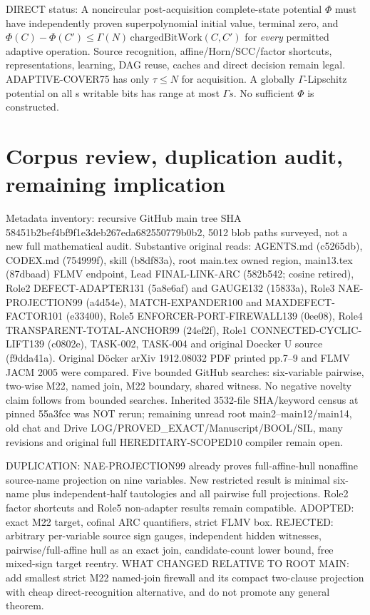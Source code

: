 \documentclass[11pt]{article}
\begin{document}
DIRECT status: A noncircular post-acquisition complete-state potential $\Phi$ must have independently proven superpolynomial initial value, terminal zero, and $\Phi(C)-\Phi(C')\le\Gamma(N)\,\mathrm{chargedBitWork}(C,C')$ for \emph{every} permitted adaptive operation. Source recognition, affine/Horn/SCC/factor shortcuts, representations, learning, DAG reuse, caches and direct decision remain legal. ADAPTIVE-COVER75 has only $\tau\le N$ for acquisition. A globally $\Gamma$-Lipschitz potential on all s writable bits has range at most $\Gamma s$. No sufficient $\Phi$ is constructed.

\section{Corpus review, duplication audit, remaining implication}
Metadata inventory: recursive GitHub main tree SHA 58451b2bef4bf9f1e3deb267eda682550779b0b2, 5012 blob paths surveyed, not a new full mathematical audit. Substantive original reads: AGENTS.md (c5265db), CODEX.md (754999f), skill (b8df83a), root main.tex owned region, main13.tex (87dbaad) FLMV endpoint, Lead FINAL-LINK-ARC (582b542; cosine retired), Role2 DEFECT-ADAPTER131 (5a8e6af) and GAUGE132 (15833a), Role3 NAE-PROJECTION99 (a4d54e), MATCH-EXPANDER100 and MAXDEFECT-FACTOR101 (e33400), Role5 ENFORCER-PORT-FIREWALL139 (0ee08), Role4 TRANSPARENT-TOTAL-ANCHOR99 (24ef2f), Role1 CONNECTED-CYCLIC-LIFT139 (c0802e), TASK-002, TASK-004 and original Doecker U source (f9dda41a). Original D\"ocker arXiv 1912.08032 PDF printed pp.7--9 and FLMV JACM 2005 were compared. Five bounded GitHub searches: six-variable pairwise, two-wise M22, named join, M22 boundary, shared witness. No negative novelty claim follows from bounded searches. Inherited 3532-file SHA/keyword census at pinned 55a3fcc was NOT rerun; remaining unread root main2--main12/main14, old chat and Drive LOG/PROVED\_EXACT/Manuscript/BOOL/SIL, many revisions and original full HEREDITARY-SCOPED10 compiler remain open.

DUPLICATION: NAE-PROJECTION99 already proves full-affine-hull nonaffine source-name projection on nine variables. New restricted result is minimal six-name plus independent-half tautologies and all pairwise full projections. Role2 factor shortcuts and Role5 non-adapter results remain compatible. ADOPTED: exact M22 target, cofinal ARC quantifiers, strict FLMV box. REJECTED: arbitrary per-variable source sign gauges, independent hidden witnesses, pairwise/full-affine hull as an exact join, candidate-count lower bound, free mixed-sign target reentry. WHAT CHANGED RELATIVE TO ROOT MAIN: add smallest strict M22 named-join firewall and its compact two-clause projection with cheap direct-recognition alternative, and do not promote any general theorem.
\end{document}
